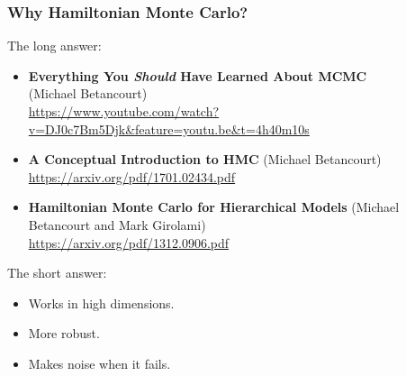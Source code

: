 \documentclass[xcolor=dvipsnames]{beamer}
\begin{document}
\begin{frame}
\frametitle{Why Hamiltonian Monte Carlo?}

The long answer: 
\begin{itemize}
\item \textbf{Everything You \emph{Should} Have Learned About MCMC} \\
(Michael Betancourt) \\
\url{https://www.youtube.com/watch?v=DJ0c7Bm5Djk&feature=youtu.be&t=4h40m10s}
\item \textbf{A Conceptual Introduction to HMC} (Michael Betancourt) \\
\url{https://arxiv.org/pdf/1701.02434.pdf}
\item \textbf{Hamiltonian Monte Carlo for Hierarchical Models} 
(Michael Betancourt and Mark Girolami) \\
\url{https://arxiv.org/pdf/1312.0906.pdf}
\end{itemize}

\vspace{0.5cm}

The short answer: 
\begin{itemize}
\item Works in high dimensions. 
\item More robust. 
\item Makes noise when it fails. 
\end{itemize}

\end{frame}
\end{document}
